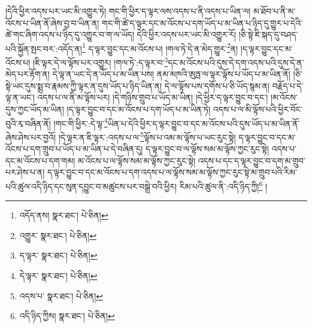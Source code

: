 །དེའི་ཕྱིར་འདས་པར་ཡང་མི་འགྱུར་ཏེ། གང་གི་ཕྱིར་ད་ལྟར་ལས་འདས་པ་ནི་འདས་པ་ཡིན་ལ། མ་ཐོབ་པ་ནི་མ་འོངས་པ་ཡིན་ནོ་ཞེས་བྱ་བ་ཡིན་ན། གང་གི་ཚེ་ད་ལྟར་དང་མ་འོངས་པ་དག་ཡོད་པ་མ་ཡིན་པ་ཉིད་དུ་གྱུར་པ་དེའི་ཚེ་གང་ཞིག་འདས་པ་ཉིད་དུ་འགྱུར་བ་ག་ལ་ཡོད། དེའི་ཕྱིར་འདས་པར་ཡང་མི་འགྱུར་རོ། །ཅི་སྟེ་ཇི་སྐད་དུ་བཤད་པའི་སྐྱོན་སྤང་བར་:འདོད་ན།\footnote{འདོད་ནས།  སྣར་ཐང་།  པེ་ཅིན། } ད་ལྟར་བྱུང་དང་མ་འོངས་པ། །གལ་ཏེ་དེ་ན་མེད་གྱུར་\footnote{འགྱུར་  སྣར་ཐང་།  པེ་ཅིན། }ན། །ད་ལྟར་བྱུང་དང་མ་འོངས་པ། །ཇི་ལྟར་དེ་ལ་ལྟོས་པར་འགྱུར། །གལ་ཏེ་:ད་ལྟར་བ་\footnote{ད་ལྟར་  སྣར་ཐང་།  པེ་ཅིན། }དང་མ་འོངས་པའི་དུས་དེ་དག་འདས་པའི་དུས་དེ་ན་མེད་པར་རྟོག་ན། དེ་ལྟ་ན་ཡང་དེ་ན་ཡོད་པ་མ་ཡིན་པས། ནམ་མཁའི་ཨུཏྤ་ལ་ལྟར་ལྟོས་པ་ཡོད་པ་མ་ཡིན་ནོ། །ཅི་སྟེ་ཡང་དུས་སྨྲ་བ་རྣམས་ཀྱི་ལྟར་ན་དུས་ཡོད་པ་ཉིད་ཡིན་ན། དེ་ལ་ལྟོས་པས་དགོས་པ་ཅི་ཡོད་སྙམ་ན། བརྗོད་པ་དེ་ལྟ་ན་ཡང་། འདས་པ་ལ་ནི་མ་ལྟོས་པར། །དེ་གཉིས་གྲུབ་པ་ཡོད་མ་ཡིན། །དེ་ཕྱིར་ད་ལྟར་བྱུང་བ་དང་། །མ་འོངས་དུས་ཀྱང་ཡོད་མ་ཡིན། །ད་ལྟར་བྱུང་བ་དང་མ་འོངས་པ་དག་ཡོད་པ་མ་ཡིན་ཏེ། འདས་པ་ལ་མི་ལྟོས་པའི་ཕྱིར་བོང་བུའི་རྭ་བཞིན་ནོ། །གང་གི་ཕྱིར་:དེ་ལྟ་\footnote{དེ་ལྟར་  སྣར་ཐང་།  པེ་ཅིན། }ཡིན་པ་དེའི་ཕྱིར་ད་ལྟར་བྱུང་བ་དང་མ་འོངས་པའི་དུས་ཡོད་པ་མ་ཡིན་ནོ་ཞེས་ཤེས་པར་བྱའོ། །དེ་ལྟར་ན་ཇི་ལྟར་:འདས་པ་ལ་\footnote{འདས་པ་  སྣར་ཐང་།  པེ་ཅིན། }ལྟོས་པ་འམ་མ་ལྟོས་པ་ཡང་རུང་སྟེ། ད་ལྟར་བྱུང་བ་དང་མ་འོངས་པ་དག་གྲུབ་པ་ཡོད་པ་མ་ཡིན་པ་དེ་བཞིན་དུ། ད་ལྟར་བྱུང་བ་ལ་ལྟོས་སམ་མ་ལྟོས་ཀྱང་རུང་སྟེ། འདས་པ་དང་མ་འོངས་པ་དག་གམ། མ་འོངས་པ་ལ་ལྟོས་སམ་མ་ལྟོས་ཀྱང་རུང་སྟེ། འདས་པ་དང་ད་ལྟར་བྱུང་བ་དག་མ་གྲུབ་པར་ཤེས་པ་ན། ད་ལྟར་བྱུང་བ་དང་མ་འོངས་པ་དག་འདས་པ་ལ་ལྟོས་སམ་མ་ལྟོས་ཀྱང་རུང་སྟེ་མ་གྲུབ་པའི་རིམ་པའི་ཚུལ་འདི་ཉིད་དང་སུན་དབྱུང་བ་མཚུངས་པར་བསྒྲེ་བའི་ཕྱིར། རིམ་པའི་ཚུལ་ནི་:འདི་ཉིད་ཀྱི།\footnote{འདི་ཉིད་ཀྱིས།  སྣར་ཐང་།  པེ་ཅིན། } །
